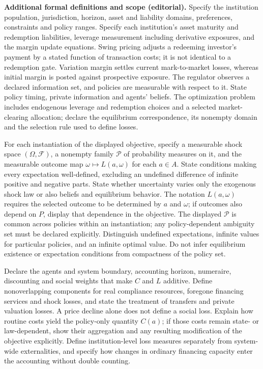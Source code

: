 \documentclass[11pt,a4paper]{article}
\begin{document}
\textbf{Additional formal definitions and scope (editorial).} Specify the institution population, jurisdiction, horizon, asset and liability domains, preferences, constraints and policy ranges. Specify each institution's asset maturity and redemption liabilities, leverage measurement including derivative exposures, and the margin update equations. Swing pricing adjusts a redeeming investor's payment by a stated function of transaction costs; it is not identical to a redemption gate. Variation margin settles current mark-to-market losses, whereas initial margin is posted against prospective exposure. The regulator observes a declared information set, and policies are measurable with respect to it. State policy timing, private information and agents' beliefs. The optimization problem includes endogenous leverage and redemption choices and a selected market-clearing allocation; declare the equilibrium correspondence, its nonempty domain and the selection rule used to define losses.

For each instantiation of the displayed objective, specify a measurable shock space \((\Omega,\mathcal F)\), a nonempty family \(\mathcal P\) of probability measures on it, and the measurable outcome map \(\omega\mapsto L(a,\omega)\) for each \(a\in A\). State conditions making every expectation well-defined, excluding an undefined difference of infinite positive and negative parts. State whether uncertainty varies only the exogenous shock law or also beliefs and equilibrium behavior. The notation \(L(a,\omega)\) requires the selected outcome to be determined by \(a\) and \(\omega\); if outcomes also depend on \(P\), display that dependence in the objective. The displayed \(\mathcal P\) is common across policies within an instantiation; any policy-dependent ambiguity set must be declared explicitly. Distinguish undefined expectations, infinite values for particular policies, and an infinite optimal value. Do not infer equilibrium existence or expectation conditions from compactness of the policy set.

Declare the agents and system boundary, accounting horizon, numeraire, discounting and social weights that make \(C\) and \(L\) additive. Define nonoverlapping components for real compliance resources, foregone financing services and shock losses, and state the treatment of transfers and private valuation losses. A price decline alone does not define a social loss. Explain how routine costs yield the policy-only quantity \(C(a)\); if those costs remain state- or law-dependent, show their aggregation and any resulting modification of the objective explicitly. Define institution-level loss measures separately from system-wide externalities, and specify how changes in ordinary financing capacity enter the accounting without double counting.
\end{document}
